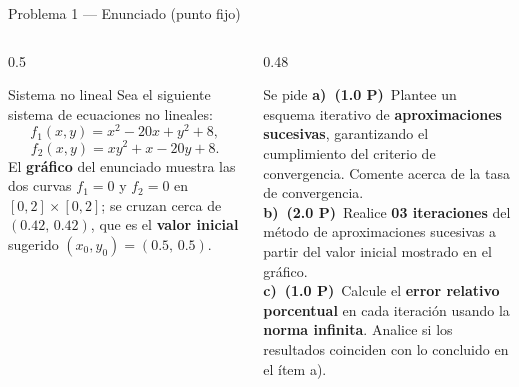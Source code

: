 \documentclass[aspectratio=169,10pt]{beamer}
\begin{document}
\begin{frame}{Problema 1 — Enunciado (punto fijo)}
\begin{columns}[T]
\begin{column}{0.5\textwidth}
\begin{cardidea}{Sistema no lineal}{\faCogs}
{\footnotesize Sea el siguiente sistema de ecuaciones no lineales:
\[
f_1(x,y)=x^{2}-20x+y^{2}+8,
\]
\[
f_2(x,y)=xy^{2}+x-20y+8.
\]
El \textbf{gráfico} del enunciado muestra las dos curvas $f_1=0$ y $f_2=0$ en $[0,2]\times[0,2]$; se cruzan cerca de $(0.42,\,0.42)$, que es el \textbf{valor inicial} sugerido $(x_0,y_0)=(0.5,\,0.5)$.}
\end{cardidea}
\end{column}
\begin{column}{0.48\textwidth}
\begin{cardidea}{Se pide}{\faTasks}
{\footnotesize
\textbf{a)\ (1.0 P)}\ Plantee un esquema iterativo de \textbf{aproximaciones sucesivas}, garantizando el cumplimiento del criterio de convergencia. Comente acerca de la tasa de convergencia.\\[1.0mm]
\textbf{b)\ (2.0 P)}\ Realice \textbf{03 iteraciones} del método de aproximaciones sucesivas a partir del valor inicial mostrado en el gráfico.\\[1.0mm]
\textbf{c)\ (1.0 P)}\ Calcule el \textbf{error relativo porcentual} en cada iteración usando la \textbf{norma infinita}. Analice si los resultados coinciden con lo concluido en el ítem a).}
\end{cardidea}
\end{column}
\end{columns}
\end{frame}
\end{document}
